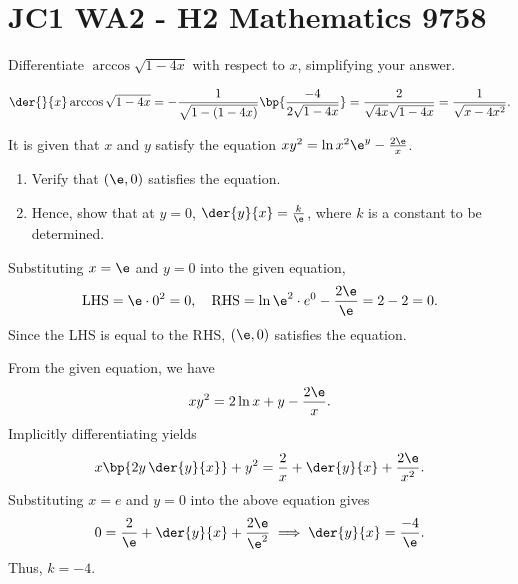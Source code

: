 \section{JC1 WA2 - H2 Mathematics 9758}

\begin{problem}
    Differentiate $\arccos{\sqrt{1 - 4x}}$ with respect to $x$, simplifying your answer.
\end{problem}
\begin{solution}
    \[\der{}{x} \arccos{\sqrt{1 - 4x}} = -\frac1{\sqrt{1 - (1 - 4x)}} \bp{\frac{-4}{2\sqrt{1 - 4x}}} = \frac2{\sqrt{4x} \sqrt{1 - 4x}} = \frac1{\sqrt{x - 4x^2}}.\]
\end{solution}

\begin{problem}
    It is given that $x$ and $y$ satisfy the equation $xy^2 = \ln{x^2 \e^y} - \frac{2\e}{x}$.
    \begin{enumerate}
        \item Verify that $(\e, 0)$ satisfies the equation.
        \item Hence, show that at $y = 0$, $\der{y}{x} = \frac{k}{\e}$, where $k$ is a constant to be determined.
    \end{enumerate}
\end{problem}
\begin{solution}
    \begin{ppart}
        Substituting $x = \e$ and $y = 0$ into the given equation, \[\text{LHS} = \e \cdot 0^2 = 0, \quad \text{RHS} = \ln{\e^2 \cdot e^0} - \frac{2\e}{\e} = 2 - 2 = 0.\] Since the LHS is equal to the RHS, $(\e, 0)$ satisfies the equation.
    \end{ppart}
    \begin{ppart}
        From the given equation, we have \[xy^2 = 2\ln x + y - \frac{2\e}{x}.\] Implicitly differentiating yields \[x \bp{2y \, \der{y}{x}} + y^2 = \frac2{x} + \der{y}{x} + \frac{2\e}{x^2}.\] Substituting $x = e$ and $y = 0$ into the above equation gives \[0 = \frac2{\e} + \der{y}{x} + \frac{2\e}{\e^2} \implies \der{y}{x} = \frac{-4}{\e}.\] Thus, $k = -4$.
    \end{ppart}
\end{solution}

